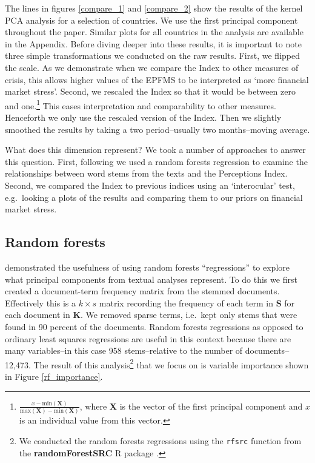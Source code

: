 \documentclass[]{article}
\begin{document}
The lines in figures \ref{compare_1} and \ref{compare_2} show the
results of the kernel PCA analysis for a selection of countries. We use
the first principal component throughout the paper. Similar plots for
all countries in the analysis are available in the Appendix. Before
diving deeper into these results, it is important to note three simple
transformations we conducted on the raw results. First, we flipped the
scale. As we demonstrate when we compare the Index to other measures of
crisis, this allows higher values of the EPFMS to be interpreted as
`more financial market stress'. Second, we rescaled the Index so that it
would be between zero and one.\footnote{\(\frac{x - \mathrm{min}(\bm{X})}{\mathrm{max}(\bm{X}) - \mathrm{min}(\bm{X})}\),
  where \(\bm{X}\) is the vector of the first principal component and
  \(x\) is an individual value from this vector.} This eases
interpretation and comparability to other measures. Henceforth we only
use the rescaled version of the Index. Then we slightly smoothed the
results by taking a two period--usually two months--moving average.

What does this dimension represent? We took a number of approaches to
answer this question. First, following \cite{Spirling2012} we used a random
forests regression \citep{Breiman2001,jones2015} to examine the
relationships between word stems from the texts and the Perceptions
Index. Second, we compared the Index to previous indices using an
`interocular' test, e.g.~looking a plots of the results and comparing
them to our priors on financial market stress.

\subsection{Random forests}\label{random-forests}

\cite[6--8]{Spirling2012} demonstrated the usefulness of using random forests
``regressions'' to explore what principal components from textual
analyses represent. To do this we first created a document-term
frequency matrix from the stemmed documents. Effectively this is a
\(k \times s\) matrix recording the frequency of each term in \(\bm{S}\)
for each document in \(\bm{K}\). We removed sparse terms, i.e.~kept only
stems that were found in 90 percent of the documents. Random forests
regressions as opposed to ordinary least squares regressions are useful
in this context because there are many variables--in this case 958
stems--relative to the number of documents--12,473. The
result of this analysis\footnote{We conducted the random forests
  regressions using the \texttt{rfsrc} function from the
  \textbf{randomForestSRC} R package \citep{randomForestSRCCite}.} that
we focus on is variable importance shown in Figure \ref{rf_importance}.
\end{document}
